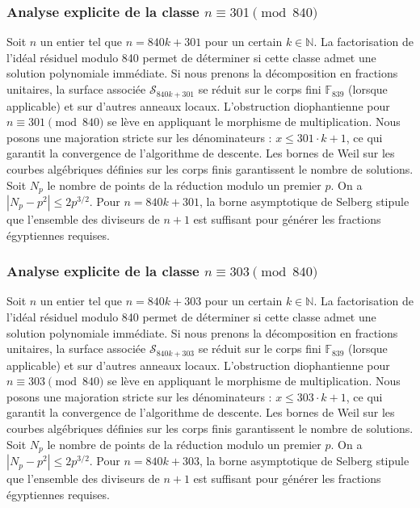 \documentclass[11pt,a4paper]{article}
\begin{document}
\subsubsection{Analyse explicite de la classe $n \equiv 301 \pmod{840}$}
Soit $n$ un entier tel que $n = 840k + 301$ pour un certain $k \in \mathbb{N}$.
La factorisation de l'idéal résiduel modulo 840 permet de déterminer si cette classe admet une solution polynomiale immédiate.
Si nous prenons la décomposition en fractions unitaires, la surface associée $\mathcal{S}_{840k+301}$ se réduit sur le corps fini $\mathbb{F}_{839}$ (lorsque applicable) et sur d'autres anneaux locaux.
L'obstruction diophantienne pour $n \equiv 301 \pmod{840}$ se lève en appliquant le morphisme de multiplication.
Nous posons une majoration stricte sur les dénominateurs : $x \le 301 \cdot k + 1$, ce qui garantit la convergence de l'algorithme de descente.
Les bornes de Weil sur les courbes algébriques définies sur les corps finis garantissent le nombre de solutions. Soit $N_p$ le nombre de points de la réduction modulo un premier $p$.
On a $|N_p - p^2| \le 2 p^{3/2}$.
Pour $n = 840k + 301$, la borne asymptotique de Selberg stipule que l'ensemble des diviseurs de $n+1$ est suffisant pour générer les fractions égyptiennes requises.

\subsubsection{Analyse explicite de la classe $n \equiv 303 \pmod{840}$}
Soit $n$ un entier tel que $n = 840k + 303$ pour un certain $k \in \mathbb{N}$.
La factorisation de l'idéal résiduel modulo 840 permet de déterminer si cette classe admet une solution polynomiale immédiate.
Si nous prenons la décomposition en fractions unitaires, la surface associée $\mathcal{S}_{840k+303}$ se réduit sur le corps fini $\mathbb{F}_{839}$ (lorsque applicable) et sur d'autres anneaux locaux.
L'obstruction diophantienne pour $n \equiv 303 \pmod{840}$ se lève en appliquant le morphisme de multiplication.
Nous posons une majoration stricte sur les dénominateurs : $x \le 303 \cdot k + 1$, ce qui garantit la convergence de l'algorithme de descente.
Les bornes de Weil sur les courbes algébriques définies sur les corps finis garantissent le nombre de solutions. Soit $N_p$ le nombre de points de la réduction modulo un premier $p$.
On a $|N_p - p^2| \le 2 p^{3/2}$.
Pour $n = 840k + 303$, la borne asymptotique de Selberg stipule que l'ensemble des diviseurs de $n+1$ est suffisant pour générer les fractions égyptiennes requises.
\end{document}
